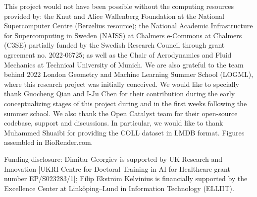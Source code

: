 \documentclass{article}
\begin{document}
\begin{ack} %

This project would not have been possible without the computing resources provided by: the Knut and Alice Wallenberg Foundation at the National Supercomputer Centre (Berzelius resource); the National Academic Infrastructure for Supercomputing in Sweden (NAISS) at Chalmers e-Commons at Chalmers (C3SE) partially funded by the Swedish Research Council through grant agreement no. 2022-06725; as well as the Chair of Aerodynamics and Fluid Mechanics at Technical University of Munich. 
We are also grateful to the team behind 2022 London Geometry and Machine Learning Summer School (LOGML), where this research project was initially conceived. We would like to specially thank Guocheng Qian and I-Ju Chen for their contribution during the early conceptualizing stages of this project during and in the first weeks following the summer school. 
We also thank the Open Catalyst team for their open-source codebase, support and discussions. In particular, we would like to thank Muhammed Shuaibi for providing the COLL dataset in LMDB format.
Figures assembled in BioRender.com.


Funding disclosure: 
Dimitar Georgiev is supported by UK Research and Innovation [UKRI Centre for Doctoral Training in AI for Healthcare grant number EP/S023283/1];
% 
Filip Ekström Kelvinius is financially supported by the Excellence Center at Linköping--Lund in Information Technology (ELLIIT).
% 

\end{ack}





\newpage
\appendix
\end{document}
